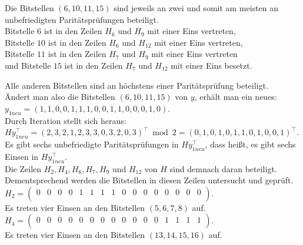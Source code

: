 \begin{Beispiel}
        
        Die Bitstellen $(6, 10, 11, 15)$ sind jeweils an zwei und somit am meisten an unbefriedigten Paritätsprüfungen beteiligt.\\ 
        Bitstelle $6$ ist in den Zeilen $H_6$ und $H_9$ mit einer Eins vertreten,\\
        Bitstelle $10$ ist in den Zeilen $H_6$ und $H_{12}$ mit einer Eins vertreten,\\
        Bitstelle $11$ ist in den Zeilen $H_7$ und $H_9$ mit einer Eins vertreten\\ 
        und Bitstelle $15$ ist in den Zeilen $H_7$ und $H_{12}$ mit einer Eins besetzt.\\
        \pagebreak
        
        Alle anderen Bitstellen sind an höchstens einer Paritätsprüfung beteiligt.\\
        Ändert man also die Bitstellen $(6, 10, 11, 15)$ von $y$, erhält man ein neues:\\
        $y_{1neu} = (1,1,0,0,1,1,1,0,0,1,1,0,0,0,1,0).$\\
        
        Durch Iteration stellt sich heraus:\\
        $Hy_{1neu}^\intercal = (2,3,2,1,2,3,3,0,3,2,0,3)^\intercal \bmod 2 =(0,1,0,1,0,1,1,0,1,0,0,1)^\intercal.$\\
        
        Es gibt sechs unbefriedigte Paritätsprüfungen in $Hy_{1neu}^\intercal$, dass hei\ss{}t, es gibt sechs Einsen in $Hy_{1neu}^\intercal.$\\
        Die Zeilen $H_2, H_4, H_6, H_7, H_9$ und $H_{12}$ von $H$ sind demnach daran beteiligt.\\ Dementsprechend werden die Bitstellen in diesen Zeilen untersucht und geprüft.\\
        
        $H_2= \left( \begin{array}{rrrrrrrrrrrrrrrr}
            0 & 0 & 0 & 0 & 1 & 1 & 1 & 1 & 0 & 0 & 0 & 0 & 0 & 0 & 0 & 0 \\
           \end{array}\right). 
        $\\
        Es treten vier Einsen an den Bitstellen $(5, 6, 7, 8)$ auf.\\
        
        $H_4= \left( \begin{array}{rrrrrrrrrrrrrrrr}
            0 & 0 & 0 & 0 & 0 & 0 & 0 & 0 & 0 & 0 & 0 & 0 & 1 & 1 & 1 & 1 \\
           \end{array}\right). 
        $\\
        Es treten vier Einsen an den Bitstellen $(13, 14, 15, 16)$ auf.\\
        

\end{Beispiel}
